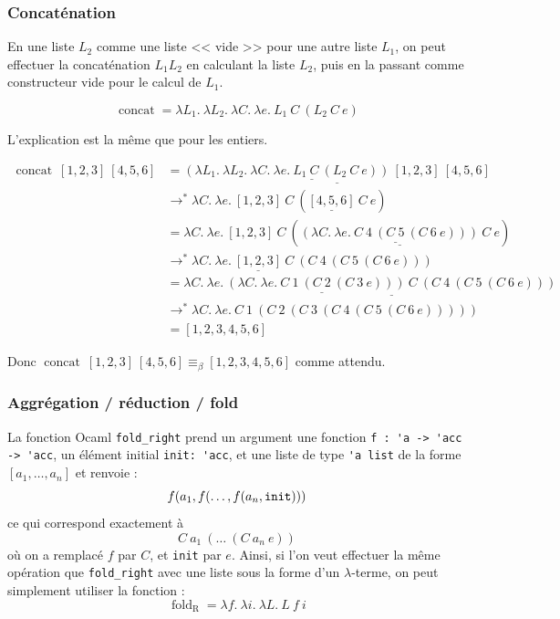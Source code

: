 \documentclass[11pt]{article}
\begin{document}
\subsubsection{Concaténation}

En une liste $L_2$ comme une liste << vide >> pour une autre liste $L_1$, on peut effectuer la concaténation $L_1L_2$ en calculant la liste $L_2$, puis en la passant comme constructeur vide pour le calcul de $L_1$.

$$\operatorname{concat} = \lambda L_1.~\lambda L_2.~\lambda C.~\lambda e.~ L_1~C~(L_2~C~e)$$

L'explication est la même que pour les entiers.
\begin{example}
\begin{equation*}
\begin{aligned}
    \operatorname{concat}~[1, 2, 3]~[4, 5, 6]&=\underline{\underline{\left(\lambda L_1.~\lambda L_2.~\lambda C.~\lambda e.~ L_1~C~(L_2~C~e)\right)~[1, 2, 3]}~[4, 5, 6]}\\
    &\longrightarrow^* \lambda C.~\lambda e.~ [1, 2, 3]~C~(\underline{[4, 5, 6]}~C~e)\\
    &=\lambda C.~\lambda e.~ [1, 2, 3]~C~(\underline{\underline{\left(\lambda C.~\lambda e.~C~4~(C~5~(C~6~e))\right)~C}~e})\\
    &\longrightarrow^* \lambda C.~\lambda e.~ \underline{[1, 2, 3]}~C~(C~4~(C~5~(C~6~e)))\\
    &= \lambda C.~\lambda e.~ \underline{\underline{\left(\lambda C.~\lambda e.~C~1~(C~2~(C~3~e))\right)~C}~(C~4~(C~5~(C~6~e)))}\\
    &\longrightarrow^* \lambda C.~\lambda e.~ C~1~(C~2~(C~3~(C~4~(C~5~(C~6~e)))))\\
    &=[1, 2, 3, 4, 5, 6]
\end{aligned}
\end{equation*}

Donc $\operatorname{concat}~[1, 2, 3]~[4, 5, 6] \equiv_\beta [1, 2, 3, 4, 5, 6]$ comme attendu.
\end{example}

\subsubsection{Aggrégation / réduction / fold}

La fonction Ocaml \verb|fold_right| prend un argument une fonction \verb|f : 'a -> 'acc -> 'acc|, un élément initial \verb|init: 'acc|, et une liste de type \verb|'a list| de la forme $[a_1, \dots, a_n]$ et renvoie :
$$f(a_1, f(\dots, f(a_n, \tt{init})))$$
ce qui correspond exactement à
$$C~a_1~(\dots~(C~a_n~e))$$
où on a remplacé $f$ par $C$, et \verb|init| par $e$. Ainsi, si l'on veut effectuer la même opération que \verb|fold_right| avec une liste sous la forme d'un $\lambda$-terme, on peut simplement utiliser la fonction :
$$\operatorname{fold}_\text{R}=\lambda f.~\lambda i.~\lambda L.~ L~f~i$$
\end{document}
